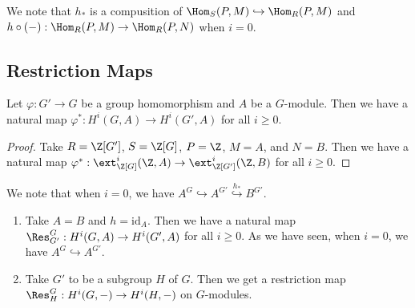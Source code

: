 We note that $h_*$ is a compusition of $\Hom_S(P, M) \hookrightarrow \Hom_R(P, M)$
and $h\circ (-): \Hom_R(P, M) \to \Hom_R(P, N)$ when $i=0$.

\subsection{Restriction Maps}
\begin{proposition}
    Let $\varphi: G' \to G$ be a group homomorphism and $A$ be a $G$-module.
    Then we have a natural map $\varphi^*: H^i(G, A) \to H^i(G', A)$ for all $i \ge 0$.
\end{proposition}
\begin{proof}
    Take $R = \Z[G']$, $S = \Z[G]$, $P = \Z$, $M = A$, and $N = B$.
    Then we have a natural map $\varphi^*: \ext^i_{\Z[G]}(\Z, A) \to \ext^i_{\Z[G']}(\Z, B)$ for all $i \ge 0$.
\end{proof}

We note that when $i=0$, we have $A^G \hookrightarrow A^{G'} \overset{h_*}{\hookrightarrow} B^{G'}$.

\begin{example}\noindent
    \begin{enumerate}
        \item Take $A = B$ and $h = \mathrm{id}_A$.
        Then we have a natural map $\Res_{G'}^G: H^i(G, A) \to H^i(G', A)$ for all $i \ge 0$.
        As we have seen, when $i=0$, we have $A^G \hookrightarrow A^{G'}$.
        \item Take $G'$ to be a subgroup $H$ of $G$.
        Then we get a restriction map $\Res_H^G: H^i(G, -) \to H^i(H, -)$ on $G$-modules.
    \end{enumerate}
\end{example}

